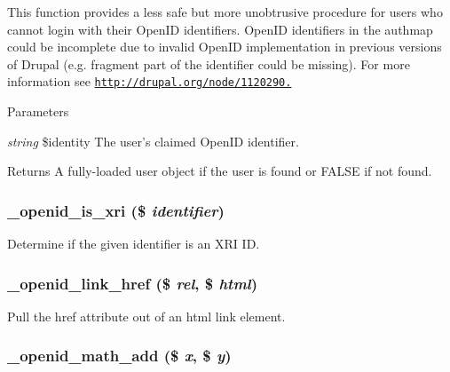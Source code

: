 This function provides a less safe but more unobtrusive procedure for users who cannot login with their OpenID identifiers. OpenID identifiers in the authmap could be incomplete due to invalid OpenID implementation in previous versions of Drupal (e.g. fragment part of the identifier could be missing). For more information see \href{http://drupal.org/node/1120290.}{\tt http://drupal.org/node/1120290.}


\begin{DoxyParams}{Parameters}
\item[{\em string}]\$identity The user's claimed OpenID identifier.\end{DoxyParams}
\begin{DoxyReturn}{Returns}
A fully-\/loaded user object if the user is found or FALSE if not found. 
\end{DoxyReturn}
\hypertarget{openid_8inc_a867ccbcc067a82d3bc691a6cdc1ad9f4}{
\subsubsection[{\_\-openid\_\-is\_\-xri}]{\setlength{\rightskip}{0pt plus 5cm}\_\-openid\_\-is\_\-xri (\$ {\em identifier})}}
\label{openid_8inc_a867ccbcc067a82d3bc691a6cdc1ad9f4}
Determine if the given identifier is an XRI ID. \hypertarget{openid_8inc_a413931ae272accf7e4161d5b032d4631}{
\subsubsection[{\_\-openid\_\-link\_\-href}]{\setlength{\rightskip}{0pt plus 5cm}\_\-openid\_\-link\_\-href (\$ {\em rel}, \/  \$ {\em html})}}
\label{openid_8inc_a413931ae272accf7e4161d5b032d4631}
Pull the href attribute out of an html link element. \hypertarget{openid_8inc_aeaea462656fcdd8460240178b6cd76a1}{
\subsubsection[{\_\-openid\_\-math\_\-add}]{\setlength{\rightskip}{0pt plus 5cm}\_\-openid\_\-math\_\-add (\$ {\em x}, \/  \$ {\em y})}}

